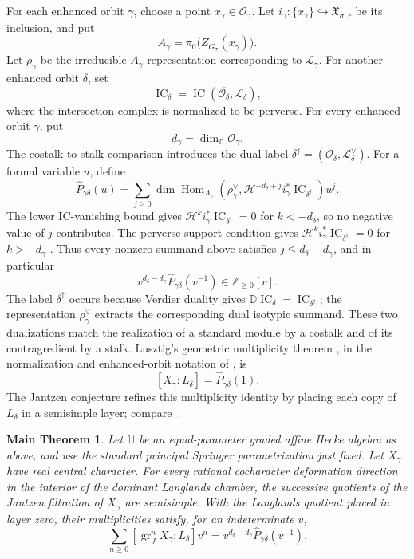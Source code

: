 \documentclass[11pt]{amsart}
\newtheorem*{maintheorem}{Main Theorem}
\theoremstyle{definition}
\theoremstyle{remark}
\newcommand{\Hh}{\mathbb H}
\newcommand{\IC}{\operatorname{IC}}
\begin{document}
For each enhanced orbit $\gamma$, choose a point
$x_\gamma\in\mathcal O_\gamma$.  Let
$i_\gamma:\{x_\gamma\}\hookrightarrow\mathfrak X_{\sigma,r}$ be its
inclusion, and put
\[
 A_\gamma=\pi_0\bigl(Z_{G_\sigma}(x_\gamma)\bigr).
\]
Let $\rho_\gamma$ be the irreducible $A_\gamma$-representation
corresponding to $\mathcal L_\gamma$.  For another enhanced orbit $\delta$, set
\[
 \IC_\delta=\IC(\overline{\mathcal O_\delta},\mathcal L_\delta),
\]
where the intersection complex is normalized to be perverse.  For every
enhanced orbit $\gamma$, put
\[
 d_\gamma=\dim_{\mathbb C}\mathcal O_\gamma.
\]
The costalk-to-stalk comparison introduces the dual label
$\delta^\dagger=(\mathcal O_\delta,\mathcal L_\delta^\vee)$.  For a formal
variable $u$, define
\begin{equation}\label{eq:full-ic-polynomial}
 \widehat P_{\gamma\delta}(u)=
 \sum_{j\geq0}
 \dim\operatorname{Hom}_{A_\gamma}\!\left(
   \rho_\gamma^\vee,
   \mathcal H^{-d_\delta+j}i_\gamma^*\IC_{\delta^\dagger}
 \right)u^j.
\end{equation}
The lower IC-vanishing bound gives
$\mathcal H^k i_\gamma^*\IC_{\delta^\dagger}=0$ for $k<-d_\delta$, so no
negative value of $j$ contributes.  The perverse support condition gives
$\mathcal H^k i_\gamma^*\IC_{\delta^\dagger}=0$ for $k>-d_\gamma$
\cite[Section~2.2]{BBD}.  Thus every nonzero summand above satisfies
$j\leq d_\delta-d_\gamma$, and in particular
\[
 v^{d_\delta-d_\gamma}\widehat P_{\gamma\delta}(v^{-1})
 \in\mathbb Z_{\geq0}[v].
\]
The label $\delta^\dagger$ occurs because Verdier duality gives
$\mathbb D\IC_\delta=\IC_{\delta^\dagger}$; the representation
$\rho_\gamma^\vee$ extracts the corresponding dual isotypic summand.  These
two dualizations match the realization of a standard module by a costalk and
of its contragredient by a stalk.
Lusztig's geometric multiplicity theorem
\cite[Proposition~10.5 and Corollary~10.7]{LusztigCuspidalII}, in the
normalization and enhanced-orbit notation of
\cite[Proposition~5.1(a)]{Solleveld}, is
\[
 [X_\gamma:L_\delta]=\widehat P_{\gamma\delta}(1).
\]
The Jantzen conjecture refines this multiplicity identity by placing each
copy of $L_\delta$ in a semisimple
layer; compare~\cite[Conjecture~6.2.2]{BC}.

\begin{maintheorem}
Let $\Hh$ be an equal-parameter graded affine Hecke algebra as above, and use
the standard principal Springer parametrization just fixed.  Let $X_\gamma$ have
real central character.  For every rational cocharacter deformation
direction in the interior of the dominant Langlands chamber, the
successive quotients of the Jantzen filtration of $X_\gamma$ are semisimple.
With the Langlands quotient placed in layer zero, their multiplicities satisfy,
for an indeterminate $v$,
\begin{equation}\label{eq:layer-polynomial}
 \sum_{n\geq0}[\operatorname{gr}_J^nX_\gamma:L_\delta]v^n
 =v^{d_\delta-d_\gamma}\widehat P_{\gamma\delta}(v^{-1}).
\end{equation}
\end{maintheorem}
\end{document}
